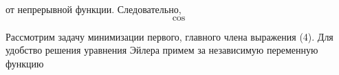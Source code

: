 \documentclass{article}
\begin{document}
   
от непрерывной функции. Следовательно,
$$
\cos
$$

    Рассмотрим задачу минимизации первого, главного
члена выражения (4). Для удобство решения уравнения 
Эйлера примем за независимую переменную функцию   
\end{document}
